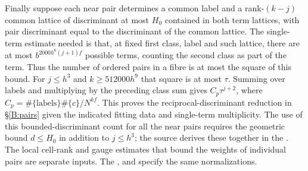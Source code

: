 Finally suppose each near pair determines a common label and a rank-$(k-j)$
common lattice of discriminant at most $H_0$ contained in both term lattices, with pair discriminant
equal to the discriminant of the common lattice. The single-term estimate
needed is that, at fixed first class, label and such lattice, there are at
most $b^{2000h^6(j+1)f}$ possible terms, counting the second class as
part of the term. Thus the number of ordered pairs in a fibre is at most
the square of this bound. For $j\le h^3$ and $k\ge512000 h^9$ that square
is at most $\tau$. Summing over labels and multiplying by the preceding
class sum gives $C_p\tau^{j+2}$, where
$C_p=\#\{\text{labels}\}\#\{c\}/N^{kf}$.
This proves the reciprocal-discriminant reduction in \S\ref{B:pairs}
given the indicated fitting data and single-term multiplicity. The use of this
bounded-discriminant count for all the near pairs requires the geometric
bound $d\le H_0$ in addition to $j\le h^3$; the source derives these together
in the . The local
cell-rank and gauge estimates that bound the weights of individual pairs
are separate inputs. The
,
 and
specify the same normalizations.

